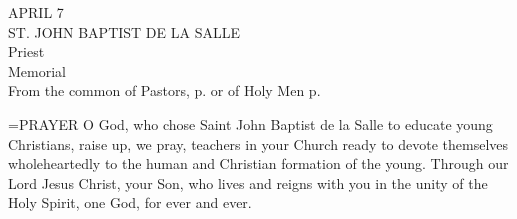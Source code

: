\begin{center}\normalsize APRIL 7\\
\footnotesize ST. JOHN BAPTIST DE LA SALLE\\
\footnotesize Priest\\
\footnotesize Memorial\\
\footnotesize From the common of Pastors, p.    or of Holy Men p. \\
\end{center}

\hangindent=\parindent \small{PRAYER 
O God, who chose Saint John Baptist de la Salle
to educate young Christians,
raise up, we pray, teachers in your Church
ready to devote themselves wholeheartedly
to the human and Christian formation of the young.
Through our Lord Jesus Christ, your Son,
who lives and reigns with you in the unity of the Holy Spirit,
one God, for ever and ever.\\}
 
